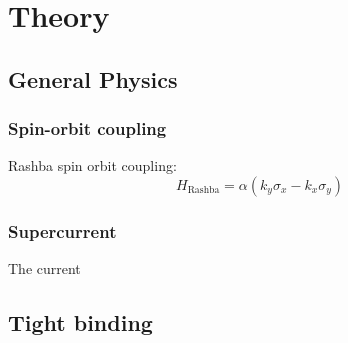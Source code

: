 \newcommand{\kx}{k_x}
\newcommand{\ky}{k_y}

\newcommand{\sigx}{\sigma_x}
\newcommand{\sigy}{\sigma_y}
\newcommand{\sigz}{\sigma_z}
\newcommand{\sigi}{\sigma_0}
\newcommand{\taux}{\tau_x}
\newcommand{\tauy}{\tau_y}
\newcommand{\tauz}{\tau_z}
\newcommand{\taui}{\tau_0}
\chapter{Theory}

\section{General Physics}
    \subsection{Spin-orbit coupling}
    Rashba spin orbit coupling:
    \begin{equation}
    	H_\text{Rashba} = \alpha (\ky \sigx - \kx \sigy) 
    \end{equation}

    \subsection{Supercurrent}
	The current 	





\section{Tight binding}




